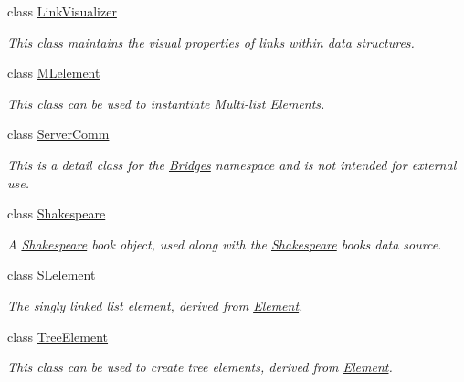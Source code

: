 \begin{DoxyCompactItemize}
class \hyperlink{classbridges_1_1_link_visualizer}{Link\+Visualizer}
\begin{DoxyCompactList}\small\item\em This class maintains the visual properties of links within data structures. \end{DoxyCompactList}\item 
class \hyperlink{classbridges_1_1_m_lelement}{M\+Lelement}
\begin{DoxyCompactList}\small\item\em This class can be used to instantiate Multi-\/list Elements. \end{DoxyCompactList}\item 
class \hyperlink{classbridges_1_1_server_comm}{Server\+Comm}
\begin{DoxyCompactList}\small\item\em This is a detail class for the \hyperlink{namespacebridges_1_1_bridges}{Bridges} namespace and is not intended for external use. \end{DoxyCompactList}\item 
class \hyperlink{classbridges_1_1_shakespeare}{Shakespeare}
\begin{DoxyCompactList}\small\item\em A \hyperlink{classbridges_1_1_shakespeare}{Shakespeare} book object, used along with the \hyperlink{classbridges_1_1_shakespeare}{Shakespeare} books data source. \end{DoxyCompactList}\item 
class \hyperlink{classbridges_1_1_s_lelement}{S\+Lelement}
\begin{DoxyCompactList}\small\item\em The singly linked list element, derived from \hyperlink{classbridges_1_1_element}{Element}. \end{DoxyCompactList}\item 
class \hyperlink{classbridges_1_1_tree_element}{Tree\+Element}
\begin{DoxyCompactList}\small\item\em This class can be used to create tree elements, derived from \hyperlink{classbridges_1_1_element}{Element}. \end{DoxyCompactList}\end{DoxyCompactItemize}
